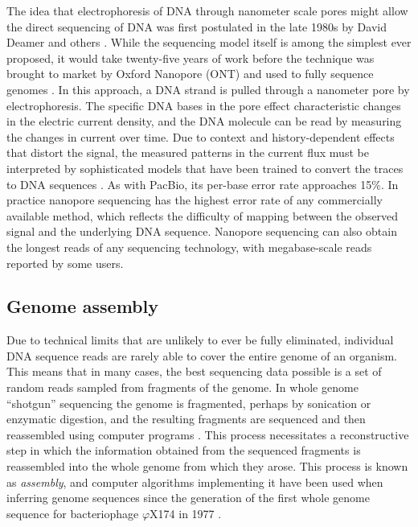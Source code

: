 The idea that electrophoresis of DNA through nanometer scale pores might allow the direct sequencing of DNA was first postulated in the late 1980s by David Deamer and others \cite{deamer2016three}.
While the sequencing model itself is among the simplest ever proposed, it would take twenty-five years of work \cite{kasianowicz1996characterization,purnell2008nucleotide} before the technique was brought to market by Oxford Nanopore (ONT) \cite{mikheyev2014first} and used to fully sequence genomes \cite{loman2015complete, jain2018nanopore}.
In this approach, a DNA strand is pulled through a nanometer pore by electrophoresis.
The specific DNA bases in the pore effect characteristic changes in the electric current density, and the DNA molecule can be read by measuring the changes in current over time.
Due to context and history-dependent effects that distort the signal, the measured patterns in the current flux must be interpreted by sophisticated models that have been trained to convert the traces to DNA sequences \cite{david2016nanocall}.
As with PacBio, its per-base error rate approaches 15\%.
In practice nanopore sequencing has the highest error rate of any commercially available method, which reflects the difficulty of mapping between the observed signal and the underlying DNA sequence.
Nanopore sequencing can also obtain the longest reads of any sequencing technology, with megabase-scale reads reported by some users.


\subsection{Genome assembly}
\label{sec:genome_assembly}

Due to technical limits that are unlikely to ever be fully eliminated, individual DNA sequence reads are rarely able to cover the entire genome of an organism.
This means that in many cases, the best sequencing data possible is a set of random reads sampled from fragments of the genome. 
In whole genome ``shotgun'' sequencing the genome is fragmented, perhaps by sonication or enzymatic digestion, and the resulting fragments are sequenced and then reassembled using computer programs \cite{gardner1981complete, sanger1982nucleotide}.
This process necessitates a reconstructive step in which the information obtained from the sequenced fragments is reassembled into the whole genome from which they arose.
This process is known as \emph{assembly}, and computer algorithms implementing it have been used when inferring genome sequences since the generation of the first whole genome sequence for bacteriophage $\varphi$X174 in 1977 \cite{sanger1977nucleotide, staden1979strategy}.

